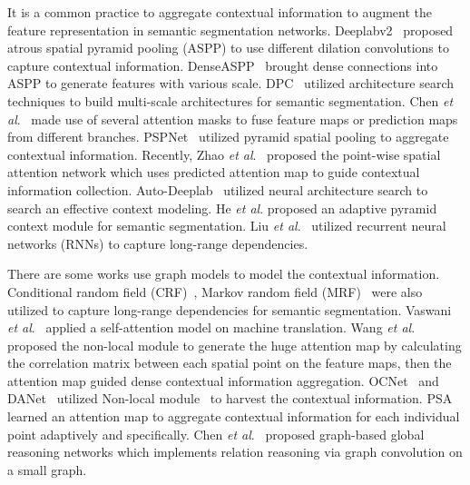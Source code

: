 \documentclass[10pt,journal,compsoc]{IEEEtran}
\def\etal{\emph{et al}.}
\begin{document}
It is a common practice to aggregate contextual information to augment the feature representation in semantic segmentation networks.
Deeplabv2~\cite{chen2018deeplab} proposed atrous spatial pyramid pooling (ASPP) to use different dilation convolutions to capture contextual information. DenseASPP~\cite{yang2018denseaspp} brought dense connections into ASPP to generate features with various scale. DPC~\cite{chen2018searching} utilized architecture search techniques to build multi-scale architectures for semantic segmentation. Chen \etal~\cite{chen2016attention} made use of several attention masks to fuse feature maps or prediction maps from different branches. PSPNet~\cite{zhao2017pyramid} utilized pyramid spatial pooling to aggregate contextual information. Recently, Zhao \etal~\cite{zhao2018psanet} proposed the point-wise spatial attention network which uses predicted attention map to guide contextual information collection. Auto-Deeplab~\cite{liu2019auto} utilized neural architecture search to search an effective context modeling. He \etal\cite{he2019adaptive} proposed an adaptive pyramid context module for semantic segmentation.
Liu \etal~\cite{liu2017learning} utilized recurrent neural networks (RNNs) to capture long-range dependencies.


There are some works use graph models to model the contextual information. Conditional random field (CRF)~\cite{chen2014semantic, zheng2015conditional, huang2018efficient}, Markov random field (MRF)~\cite{liu2015semantic} were also utilized to capture long-range dependencies for semantic segmentation. 
Vaswani \etal~\cite{vaswani2017attention} applied a self-attention model on machine translation. Wang \etal~\cite{wang2018non} proposed the non-local module to generate the huge attention map by calculating the correlation matrix between each spatial point on the feature maps, then the attention map guided dense contextual information aggregation. OCNet~\cite{yuan2018ocnet} and DANet~\cite{fu2018dual} utilized Non-local module~\cite{wang2018non} to harvest the contextual information. PSA~\cite{zhao2018psanet} learned an attention map to aggregate contextual information for each individual point adaptively and specifically. Chen \etal~\cite{chen2019graph} proposed graph-based global reasoning networks which implements relation reasoning via graph convolution on a small graph.
\end{document}
